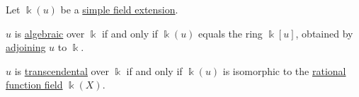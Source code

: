 \begin{proposition}\label{thm:simple_field_extension_characterization}
  Let \( \Bbbk(u) \) be a \hyperref[def:simple_field_extension]{simple field extension}.
  \begin{thmenum}
     \( u \) is \hyperref[def:algebraic_element]{algebraic} over \( \Bbbk \) if and only if \( \Bbbk(u) \) equals the ring \( \Bbbk[u] \), obtained by \hyperref[def:semiring_adjunction]{adjoining} \( u \) to \( \Bbbk \).

     \( u \) is \hyperref[def:transcendental_element]{transcendental} over \( \Bbbk \) if and only if \( \Bbbk(u) \) is isomorphic to the \hyperref[def:rational_function_field]{rational function field} \( \Bbbk(X) \).
  \end{thmenum}
\end{proposition}
